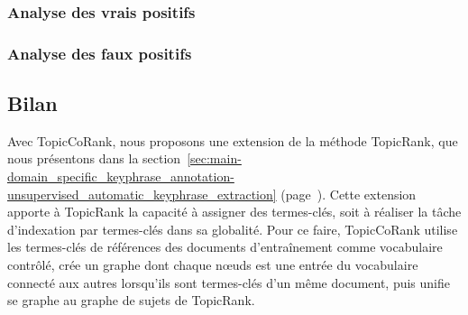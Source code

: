       \subsubsection{Analyse des vrais positifs}
      \label{subsec:main-domain_specific_keyphrase_annotation-supervised_automatic_keyphrase_annotation-error_analysis-true_positives}

      \subsubsection{Analyse des faux positifs}
      \label{subsec:main-domain_specific_keyphrase_annotation-supervised_automatic_keyphrase_annotation-error_analysis-false_positives}

    \subsection{Bilan}
    \label{subsec:main-domain_specific_keyphrase_annotation-supervised_automatic_keyphrase_annotation-conclusion}
      Avec TopicCoRank, nous proposons une extension de la méthode TopicRank,
      que nous présentons dans la
      section~\ref{sec:main-domain_specific_keyphrase_annotation-unsupervised_automatic_keyphrase_extraction}
      (page~\pageref{sec:main-domain_specific_keyphrase_annotation-unsupervised_automatic_keyphrase_extraction}).
      Cette extension apporte à TopicRank la capacité à assigner des
      termes-clés, soit à réaliser la tâche d'indexation par termes-clés dans sa
      globalité. Pour ce faire, TopicCoRank utilise les termes-clés de
      références des documents d'entraînement comme vocabulaire contrôlé, crée
      un graphe dont chaque n\oe{}uds est une entrée du vocabulaire connecté aux
      autres lorsqu'ils sont termes-clés d'un même document, puis unifie se
      graphe au graphe de sujets de TopicRank.



